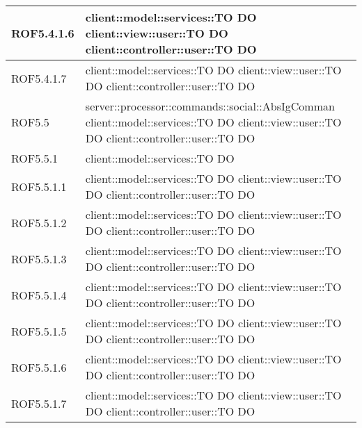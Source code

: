 \begin{center}
\begin{longtable}{| p{2.5cm} | p{11cm} |}
\hline
ROF5.4.1.6 & client::model::services::TO DO \newline client::view::user::TO DO \newline client::controller::user::TO DO \\
\hline
ROF5.4.1.7 & client::model::services::TO DO \newline client::view::user::TO DO \newline client::controller::user::TO DO \\
\hline
ROF5.5 & server::processor::commands::social::AbsIgComman \newline client::model::services::TO DO \newline client::view::user::TO DO \newline client::controller::user::TO DO \\
\hline
ROF5.5.1 & client::model::services::TO DO \\
\hline
ROF5.5.1.1 & client::model::services::TO DO \newline client::view::user::TO DO \newline client::controller::user::TO DO \\
\hline
ROF5.5.1.2 & client::model::services::TO DO \newline client::view::user::TO DO \newline client::controller::user::TO DO \\
\hline
ROF5.5.1.3 & client::model::services::TO DO \newline client::view::user::TO DO \newline client::controller::user::TO DO \\
\hline
ROF5.5.1.4 & client::model::services::TO DO \newline client::view::user::TO DO \newline client::controller::user::TO DO \\
\hline
ROF5.5.1.5 & client::model::services::TO DO \newline client::view::user::TO DO \newline client::controller::user::TO DO \\
\hline
ROF5.5.1.6 & client::model::services::TO DO \newline client::view::user::TO DO \newline client::controller::user::TO DO \\
\hline
ROF5.5.1.7 & client::model::services::TO DO \newline client::view::user::TO DO \newline client::controller::user::TO DO \\

\end{longtable}
\end{center}
